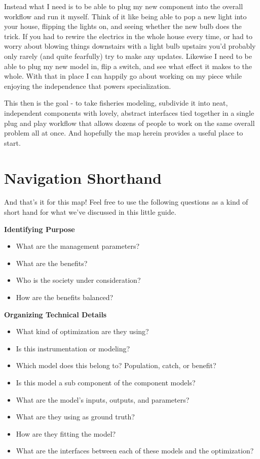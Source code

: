 \documentclass[11pt,a5paper]{book}
\begin{document}
Instead what I need is to be able to plug my new component into the overall workflow and run it myself. Think of it like being able to pop a new light into your house, flipping the lights on, and seeing whether the new bulb does the trick. If you had to rewire the electrics in the whole house every time, or had to worry about blowing things downstairs with a light bulb upstairs you'd probably only rarely (and quite fearfully) try to make any updates. Likewise I need to be able to plug my new model in, flip a switch, and see what effect it makes to the whole. With that in place I can happily go about working on my piece while enjoying the independence that powers specialization.
\newline

This then is the goal - to take fisheries modeling, subdivide it into neat, independent components with lovely, abstract interfaces tied together in a single plug and play workflow that allows dozens of people to work on the same overall problem all at once. And hopefully the map herein provides a useful place to start. 

\chapter{Navigation Shorthand}

And that's it for this map! Feel free to use the following questions as a kind of short hand for what we've discussed in this little guide.
\newline

\noindent \textbf{Identifying Purpose}

\begin{itemize}
\item What are the management parameters?
\item What are the benefits?
\item Who is the society under consideration?
\item How are the benefits balanced?
\end{itemize}

\noindent \textbf{Organizing Technical Details}

\begin{itemize}
\item What kind of optimization are they using?
\item Is this instrumentation or modeling?
\item Which model does this belong to? Population, catch, or benefit?
\item Is this model a sub component of the component models? 
\item What are the model's inputs, outputs, and parameters?
\item What are they using as ground truth?
\item How are they fitting the model?
\item What are the interfaces between each of these models and the optimization?
\end{itemize}
\end{document}
